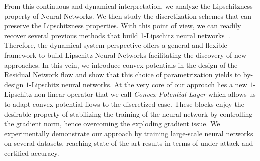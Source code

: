 From this continuous and dynamical interpretation, we  analyze the Lipschitzness property of Neural Networks. We then study the discretization schemes that can preserve the Lipschitzness properties. With this point of view, we can readily recover several previous methods that build 1-Lipschitz neural networks~\citep{trockman2021orthogonalizing,skew2021sahil}.
Therefore, the dynamical system perspective offers a general and flexible framework to build Lipschitz Neural Networks facilitating the discovery of new approaches.
In this vein, we introduce convex potentials in the design of the Residual Network flow and show that this choice of parametrization yields to by-design $1$-Lipschitz neural networks.
At the very core of our approach lies a new $1$-Lipschitz non-linear operator that we call {\em Convex Potential Layer} which allows us to adapt convex potential flows to the discretized case. 
These blocks enjoy the desirable property of stabilizing the training of the neural network by controlling the gradient norm, hence overcoming the exploding gradient issue.
We experimentally demonstrate our approach by training large-scale neural networks on several datasets, reaching state-of-the art results in terms of under-attack and certified accuracy.

